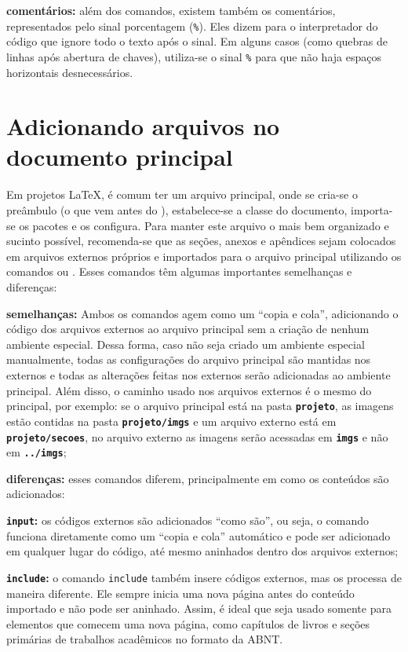 \begin{alineas}
	\item \textbf{comentários:} além dos comandos, existem também os comentários, representados pelo sinal porcentagem (\texttt{\%}). Eles dizem para o interpretador do código que ignore todo o texto após o sinal. Em alguns casos (como quebras de linhas após abertura de chaves), utiliza-se o sinal \texttt{\%} para que não haja espaços horizontais desnecessários.
\end{alineas}

\section{Adicionando arquivos no documento principal}

Em projetos \LaTeX, é comum ter um arquivo principal, onde se cria-se o preâmbulo (o que vem antes do \verb||), estabelece-se a classe do documento, importa-se os pacotes e os configura. Para manter este arquivo o mais bem organizado e sucinto possível, recomenda-se que as seções, anexos e apêndices sejam colocados em arquivos externos próprios e importados para o arquivo principal utilizando os comandos \verb*|| ou \verb*||. Esses comandos têm algumas importantes semelhanças e diferenças:

\begin{alineas}
	\item \textbf{semelhanças:} Ambos os comandos agem como um ``copia e cola'', adicionando o código dos arquivos externos ao arquivo principal sem a criação de nenhum ambiente especial. Dessa forma, caso não seja criado um ambiente especial manualmente, todas as configurações do arquivo principal são mantidas nos externos e todas as alterações feitas nos externos serão adicionadas ao ambiente principal. Além disso, o caminho usado nos arquivos externos é o mesmo do principal, por exemplo: se o arquivo principal está na pasta \textbf{\texttt{projeto}}, as imagens estão contidas na pasta \textbf{\texttt{projeto/imgs}} e um arquivo externo está em \textbf{\texttt{projeto/secoes}}, no arquivo externo as imagens serão acessadas em \textbf{\texttt{imgs}} e não em \textbf{\texttt{../imgs}};
	
	\item \textbf{diferenças:} esses comandos diferem, principalmente em como os conteúdos são adicionados:
	\begin{alineas}
		\item \textbf{\texttt{input}:} os códigos externos são adicionados ``como são'', ou seja, o comando funciona diretamente como um ``copia e cola'' automático e pode ser adicionado em qualquer lugar do código, até mesmo aninhados dentro dos arquivos externos;
		
		\item \textbf{\texttt{include}:} o comando \texttt{include} também insere códigos externos, mas os processa de maneira diferente. Ele sempre inicia uma nova página antes do conteúdo importado e não pode ser aninhado. Assim, é ideal que seja usado somente para elementos que comecem uma nova página, como capítulos de livros e seções primárias de trabalhos acadêmicos no formato da ABNT.
	\end{alineas}
\end{alineas}


